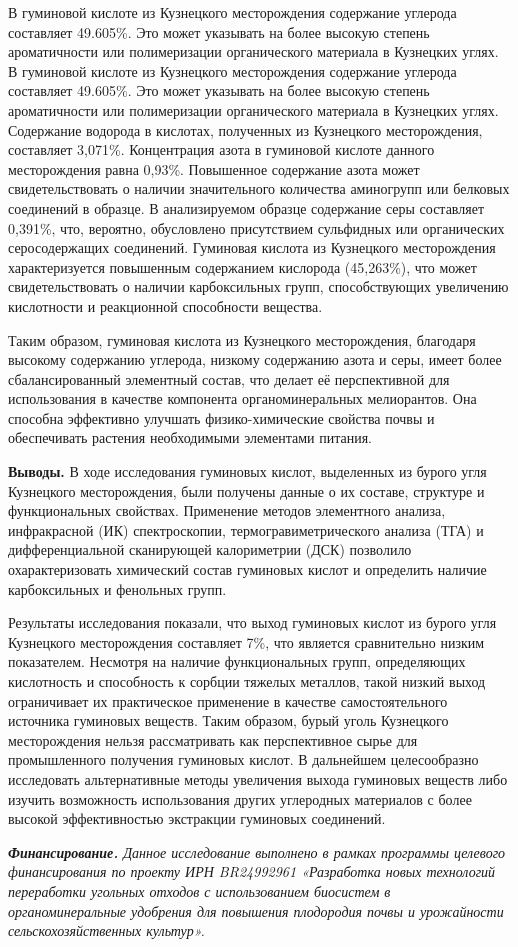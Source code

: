 \begin{multicols}{2}
В гуминовой кислоте из Кузнецкого месторождения содержание углерода
составляет 49.605\%. Это может указывать на более высокую степень
ароматичности или полимеризации органического материала в Кузнецких
углях. В гуминовой кислоте из Кузнецкого месторождения содержание
углерода составляет 49.605\%. Это может указывать на более высокую
степень ароматичности или полимеризации органического материала в
Кузнецких углях. Содержание водорода в кислотах, полученных из
Кузнецкого месторождения, составляет 3,071\%. Концентрация азота в
гуминовой кислоте данного месторождения равна 0,93\%. Повышенное
содержание азота может свидетельствовать о наличии значительного
количества аминогрупп или белковых соединений в образце. В анализируемом
образце содержание серы составляет 0,391\%, что, вероятно, обусловлено
присутствием сульфидных или органических серосодержащих соединений.
Гуминовая кислота из Кузнецкого месторождения характеризуется повышенным
содержанием кислорода (45,263\%), что может свидетельствовать о наличии
карбоксильных групп, способствующих увеличению кислотности и реакционной
способности вещества.

Таким образом, гуминовая кислота из Кузнецкого месторождения, благодаря
высокому содержанию углерода, низкому содержанию азота и серы, имеет
более сбалансированный элементный состав, что делает её перспективной
для использования в качестве компонента органоминеральных мелиорантов.
Она способна эффективно улучшать физико-химические свойства почвы и
обеспечивать растения необходимыми элементами питания.

{\bfseries Выводы.} В ходе исследования гуминовых кислот, выделенных из
бурого угля Кузнецкого месторождения, были получены данные о их составе,
структуре и функциональных свойствах. Применение методов элементного
анализа, инфракрасной (ИК) спектроскопии, термогравиметрического анализа
(ТГА) и дифференциальной сканирующей калориметрии (ДСК) позволило
охарактеризовать химический состав гуминовых кислот и определить наличие
карбоксильных и фенольных групп.

Результаты исследования показали, что выход гуминовых кислот из бурого
угля Кузнецкого месторождения составляет 7\%, что является сравнительно
низким показателем. Несмотря на наличие функциональных групп,
определяющих кислотность и способность к сорбции тяжелых металлов, такой
низкий выход ограничивает их практическое применение в качестве
самостоятельного источника гуминовых веществ. Таким образом, бурый уголь
Кузнецкого месторождения нельзя рассматривать как перспективное сырье
для промышленного получения гуминовых кислот. В дальнейшем целесообразно
исследовать альтернативные методы увеличения выхода гуминовых веществ
либо изучить возможность использования других углеродных материалов с
более высокой эффективностью экстракции гуминовых соединений.

\emph{{\bfseries Финансирование.} Данное исследование выполнено в рамках
программы целевого финансирования по проекту ИРН BR24992961 «Разработка
новых технологий переработки угольных отходов с использованием биосистем
в органоминеральные удобрения для повышения плодородия почвы и
урожайности сельскохозяйственных культур».}
\end{multicols}


